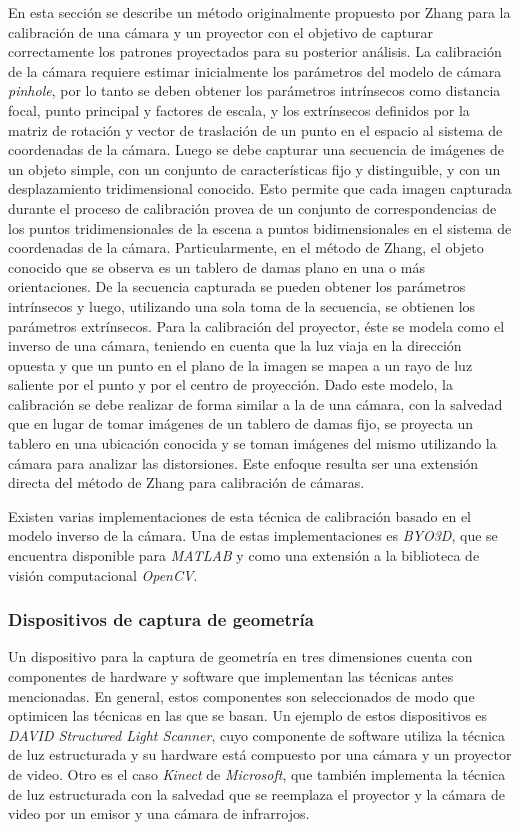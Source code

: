En esta sección se describe un método originalmente propuesto por Zhang\cite{ZhangS} para la calibración de una cámara y un proyector con el objetivo de capturar correctamente los patrones proyectados para su posterior análisis.
La calibración de la cámara requiere estimar inicialmente los parámetros del modelo de cámara \emph{pinhole}, por lo tanto se deben obtener los parámetros intrínsecos como distancia focal, punto principal y factores de escala, y los extrínsecos definidos por la matriz de rotación y vector de traslación de un punto en el espacio al sistema de coordenadas de la cámara.
Luego se debe capturar una secuencia de imágenes de un objeto simple, con un conjunto de características fijo y distinguible, y con un desplazamiento tridimensional conocido. Esto permite que cada imagen capturada durante el proceso de calibración provea de un conjunto de correspondencias de los puntos tridimensionales de la escena a puntos bidimensionales en el sistema de coordenadas de la cámara. Particularmente, en el método de Zhang, el objeto conocido que se observa es un tablero de damas plano en una o más orientaciones. De la secuencia capturada se pueden obtener los parámetros intrínsecos y luego, utilizando una sola toma de la secuencia, se obtienen los parámetros extrínsecos.
Para la calibración del proyector, éste se modela como el inverso de una cámara, teniendo en cuenta que la luz viaja en la dirección opuesta y que un punto en el plano de la imagen se mapea a un rayo de luz saliente por el punto y por el centro de proyección.
Dado este modelo, la calibración se debe realizar de forma similar a la de una cámara, con la salvedad que en lugar de tomar imágenes de un tablero de damas fijo, se proyecta un tablero en una ubicación conocida y se toman imágenes del mismo utilizando la cámara para analizar las distorsiones. Este enfoque resulta ser una extensión directa del método de Zhang para calibración de cámaras.

Existen varias implementaciones de esta técnica de calibración basado en el modelo inverso de la cámara. Una de estas implementaciones es \emph{BYO3D}\cite{BYO3D}, que se encuentra disponible para \emph{MATLAB}\cite{MATLAB} y como una extensión a la biblioteca de visión computacional \emph{OpenCV}\cite{OpenCV}.

\subsubsection{Dispositivos de captura de geometría}

Un dispositivo para la captura de geometría en tres dimensiones cuenta con componentes de hardware y software que implementan las técnicas antes mencionadas.
En general, estos componentes son seleccionados de modo que optimicen las técnicas en las que se basan.
Un ejemplo de estos dispositivos es \emph{DAVID Structured Light Scanner\cite{DAVID}}, cuyo componente de software utiliza la técnica de luz estructurada y su hardware está compuesto por una cámara y un proyector de video. Otro es el caso \emph{Kinect} de \emph{Microsoft}, que también implementa la técnica de luz estructurada con la salvedad que se reemplaza el proyector y la cámara de video por un emisor y una cámara de infrarrojos.

